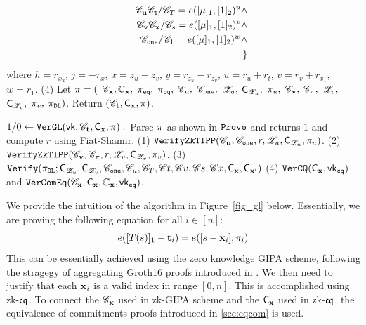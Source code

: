 \begin{footnotesize}
\begin{algorithm}[bt]
\begin{eqnarray*}
& & \hspace*{0.1in}
	{\mathscr{C}}_{{{\mathbf {u}}}} {\mathscr{C}}_{{{\mathbf {t}}}} / {\mathscr{C}}_{T}  
		=  e([\mu]_1, [1]_2)^u \wedge  \\
& & \hspace*{0.1in}
	{\mathscr{C}}_{{{\mathbf {v}}}} {\mathscr{C}}_{{{\mathbf {x}}}} / {\mathscr{C}}_{s}  
		=  e([\mu]_1, [1]_2)^v \wedge  \\
& & \hspace*{0.1in}
	{\mathscr{C}}_{\tt{one}} / {\mathscr{C}}_{1} =  e([\mu]_1, [1]_2)^w \wedge  \\
& &\}
\end{eqnarray*}
where $h=r_{x_2}$, $j=-r_x$, $x = z_u - z_v$, $y = r_{z_u} - r_{z_v}$, $u = r_u + r_t$,
$v = r_v + r_{x_1}$, $w = r_1$. \newline
(4) Let $\pi = ($
	${\mathscr{C}}_{{{\mathbf {x}}}}, {\mathbb{C}}_{{{\mathbf {x}}}},$
	$\pi_{{\tt eq}}, $
	$\pi_{{\tt cq}}, $
	${\mathscr{C}}_{{{\mathbf {u}}}}, $
	${\mathscr{C}}_{{\tt one}},$ 
	${\mathscr{Z}}_u,$ ${\mathsf{C}}_{{\mathscr{Z}}_u},$ $\pi_u,$
	${\mathscr{C}}_{{{\mathbf {v}}}}, $
	${\mathscr{C}}_{{{\mathbf {\pi}}}},$
	${\mathscr{Z}}_v, $
	${\mathsf{C}}_{{\mathscr{Z}}_v},$ 
	$\pi_v,$ 
	$\pi_{{\tt DL}})$.
	Return $({\mathscr{C}}_{{{\mathbf {t}}}}, {\mathsf{C}}_{{{\mathbf {x}}}}, \pi)$. \newline

$1/0 \leftarrow {\texttt{VerGL}}(\mathsf{vk}, 
	{\mathscr{C}}_{{{\mathbf {t}}}}, {\mathsf{C}}_{{{\mathbf {x}}}}, \pi):$  \newline
Parse $\pi$ as shown in $\texttt{Prove}$ and returns $1$
	and compute $r$ using Fiat-Shamir. \newline
(1) ${\mathtt{VerifyZkTIPP}}({\mathscr{C}}_{{{\mathbf {u}}}}, {\mathscr{C}}_{{\tt one}}, r, {\mathscr{Z}}_u, 
	{\mathsf{C}}_{{\mathscr{Z}}_u}, \pi_u)$. \newline
(2) ${\mathtt{VerifyZkTIPP}}({\mathscr{C}}_{{{\mathbf {v}}}}, {\mathscr{C}}_{{{\mathbf {\pi}}}}, 
	r, {\mathscr{Z}}_v, {\mathsf{C}}_{{\mathscr{Z}}_v}, \pi_v)$. \newline
(3)  $\texttt{Verify}(\pi_{{\tt DL}}; {\mathsf{C}}_{{\mathscr{Z}}_u}, {\mathsf{C}}_{{\mathscr{Z}}_v}, 
	{\mathscr{C}}_{\tt{one}}, {\mathscr{C}}_{u}, {\mathscr{C}}_{T}, {\mathscr{C}}{t},
	{\mathscr{C}}{v}, {\mathscr{C}}{s}, {\mathscr{C}}{x}, {\mathsf{C}}_{{{\mathbf {x}}}}, {\mathsf{C}}_{{{\mathbf {x}}}'})$  \newline
(4) ${\texttt{VerCQ}}({\mathsf{C}}_{{{\mathbf {x}}}}, \mathsf{vk}_{{\tt cq}})$ and
${\texttt{VerComEq}}({\mathscr{C}}_{{{\mathbf {x}}}}, {\mathsf{C}}_{{{\mathbf {x}}}}, {\mathbb{C}}_{{{\mathbf {x}}}},
\mathsf{vk}_{{\tt eq}})$.

\caption{Position Hiding Group Elements Lookup Protocol} 
\label{fig_gl}
\end{algorithm}
\end{footnotesize}

We provide the intuition of the algorithm in Figure\ \ref{fig_gl} below.
Essentially, we are proving the following equation for
all $i\in [n]:$
\[
	e([T(s)]_1 - {{\mathbf {t}}}_i) = e([s-{{\mathbf {x}}}_i], \pi_i)
\]
This can be essentially achieved using the zero knowledge GIPA scheme,
following the stragegy of aggregating Groth16 proofs introduced in
\cite{Bunz21}. We then need to justify that each ${{\mathbf {x}}}_i$ is a
valid index in range $[0,n]$. This is accomplished using
zk-${\mathfrak{cq}}$. To connect the ${\mathscr{C}}_{{{\mathbf {x}}}}$ used in zk-GIPA scheme
and the ${\mathsf{C}}_{{{\mathbf {x}}}}$ used in zk-${\mathfrak{cq}}$, the
equivalence of commitments proofs introduced in \ref{sec:eqcom}
is used.

